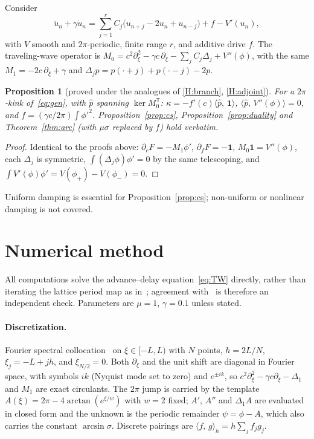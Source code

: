 \documentclass[11pt]{article}
\theoremstyle{plain}
\newtheorem{proposition}[theorem]{Proposition}
\theoremstyle{definition}
\theoremstyle{remark}
\newcommand{\ip}[2]{\langle #1,\,#2\rangle}
\newcommand{\ph}{\hat p}
\newcommand{\one}{\mathbf 1}
\newcommand{\T}{\mathsf T}
\newcommand{\tagC}[1]{\textsf{proved under #1}}
\begin{document}
Consider
\begin{equation}\label{eq:gen}
  \ddot u_n+\gamma\dot u_n=\sum_{j=1}^{r}C_j\bigl(u_{n+j}-2u_n+u_{n-j}\bigr)+f-V'(u_n),
\end{equation}
with $V$ smooth and $2\pi$-periodic, finite range $r$, and additive drive $f$. The
traveling-wave operator is
$M_0=c^2\partial_\xi^2-\gamma c\,\partial_\xi-\sum_jC_j\Delta_j+V''(\phi)$, with the same
$M_1=-2c\,\partial_\xi+\gamma$ and $\Delta_jp=p(\cdot+j)+p(\cdot-j)-2p$.

\begin{proposition}[\tagC{the analogues of \ref{H:branch}, \ref{H:adjoint}}]\label{prop:gen}
For a $2\pi$-kink of~\eqref{eq:gen}, with $\ph$ spanning $\ker M_0^{\T}$:
$\kappa=-f'(c)\ip{\ph}{\one}$, $\ip{\ph}{V''(\phi)}=0$, and
$f=(\gamma c/2\pi)\int\phi'^2$. Proposition~\ref{prop:cs}, Proposition~\ref{prop:duality} and
Theorem~\ref{thm:arc} (with $\mu\sigma$ replaced by $f$) hold verbatim.
\end{proposition}

\begin{proof}
Identical to the proofs above: $\partial_cF=-M_1\phi'$, $\partial_fF=-\one$,
$M_0\one=V''(\phi)$, each $\Delta_j$ is symmetric, $\int(\Delta_j\phi)\phi'=0$ by the same
telescoping, and $\int V'(\phi)\phi'=V(\phi_+)-V(\phi_-)=0$.
\end{proof}

Uniform damping is essential for Proposition~\ref{prop:cs}; non-uniform or nonlinear
damping is not covered.

\section{Numerical method}\label{sec:numerics}

All computations solve the advance--delay equation~\eqref{eq:TW} directly, rather than
iterating the lattice period map as in~\cite{VCKX20}; agreement with~\cite{VCKX20} is
therefore an independent check. Parameters are $\mu=1$, $\gamma=0.1$ unless stated.

\paragraph{Discretization.} Fourier spectral collocation~\cite{Tre00} on $\xi\in[-L,L)$ with
$N$ points, $h=2L/N$, $\xi_j=-L+jh$, and $\xi_{N/2}=0$. Both $\partial_\xi$ and the unit shift
are diagonal in Fourier space, with symbols $ik$ (Nyquist mode set to zero) and $e^{\pm ik}$,
so $c^2\partial_\xi^2-\gamma c\partial_\xi-\Delta_1$ and $M_1$ are exact circulants. The
$2\pi$ jump is carried by the template $A(\xi)=2\pi-4\arctan(e^{\xi/w})$ with $w=2$ fixed;
$A'$, $A''$ and $\Delta_1A$ are evaluated in closed form and the unknown is the periodic
remainder $\psi=\phi-A$, which also carries the constant $\arcsin\sigma$. Discrete pairings
are $\ip fg_h=h\sum_jf_jg_j$.
\end{document}
